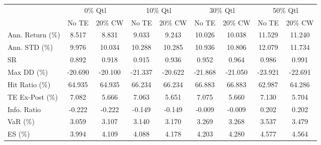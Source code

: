 \begin{tabular}{lcccccccc}
\toprule
{} & \multicolumn{2}{c}{0\% Qtl} & \multicolumn{2}{c}{10\% Qtl} & \multicolumn{2}{c}{30\% Qtl} & \multicolumn{2}{c}{50\% Qtl} \\
{} &   No TE &  20\% CW &   No TE &  20\% CW &   No TE &  20\% CW &   No TE &  20\% CW \\
\midrule
Ann. Return (\%) &   8.517 &   8.831 &   9.033 &   9.243 &  10.026 &  10.038 &  11.529 &  11.240 \\
Ann. STD (\%)    &   9.976 &  10.034 &  10.288 &  10.285 &  10.936 &  10.806 &  12.079 &  11.734 \\
SR              &   0.892 &   0.918 &   0.915 &   0.936 &   0.952 &   0.964 &   0.986 &   0.991 \\
Max DD (\%)      & -20.690 & -20.100 & -21.337 & -20.622 & -21.868 & -21.050 & -23.921 & -22.691 \\
Hit Ratio (\%)   &  64.935 &  64.935 &  66.234 &  66.234 &  66.883 &  66.883 &  62.987 &  64.286 \\
TE Ex-Post (\%)  &   7.082 &   5.666 &   7.063 &   5.651 &   7.075 &   5.660 &   7.130 &   5.704 \\
Info. Ratio     &  -0.222 &  -0.222 &  -0.149 &  -0.149 &  -0.009 &  -0.009 &   0.202 &   0.202 \\
VaR (\%)         &   3.059 &   3.107 &   3.140 &   3.170 &   3.269 &   3.268 &   3.537 &   3.479 \\
ES (\%)          &   3.994 &   4.109 &   4.088 &   4.178 &   4.203 &   4.280 &   4.577 &   4.564 \\
\bottomrule
\end{tabular}
